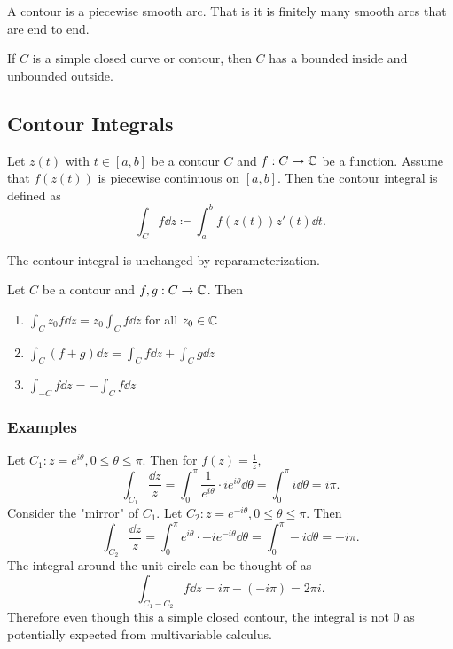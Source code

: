 \documentclass[../notes.tex]{subfiles}
\begin{document}
\begin{definition}[Contour]
    A contour is a piecewise smooth arc. That is it is finitely many smooth arcs that are end to end.
\end{definition}

\begin{theorem}
    If $C$ is a simple closed curve or contour, then $C$ has a bounded inside and unbounded outside.
\end{theorem}

\subsection{Contour Integrals}

\begin{definition}
    Let $z(t)$ with $t \in [a,b]$ be a contour $C$ and $f: C \to \mathbb{C}$ be a function. Assume that $f(z(t))$ is piecewise continuous on $[a,b]$. Then the contour integral is defined as
    \[
        \int_C f\dd z \coloneq \int_a^b f(z(t)) z'(t) \dd t
    .\]

    \begin{remark}
        The contour integral is unchanged by reparameterization.
    \end{remark}
\end{definition}

\begin{theorem}
    \label{thm:propsofcontoursint}
    Let $C$ be a contour and $f,g : C \to \mathbb{C}$. Then
    \begin{enumerate}
        \item $\displaystyle \int_C z_0 f \dd z = z_0 \int_C f \dd z$ for all $z_0 \in \mathbb{C}$
        \item $\displaystyle \int_C (f+g) \dd z = \int_C f \dd z + \int_C g \dd z$
        \item $\displaystyle \int_{-C} f \dd z = - \int_C f \dd z$
    \end{enumerate}
\end{theorem}

\subsubsection{Examples}

\begin{example}
    Let $C_1 : z = e^{i \theta}, 0 \leq \theta \leq \pi$. Then for $f(z) = \frac{1}{z}$,
    \[
        \int_{C_1} \frac{\dd z}{z} = \int_0^\pi \frac{1}{e^{i \theta}} \cdot i e^{i \theta} \dd \theta = \int_0^\pi i \dd \theta = i \pi
    .\]
    Consider the "mirror" of $C_1$. Let $C_2 : z = e^{-i \theta}, 0 \leq \theta \leq \pi$. Then
    \[
        \int_{C_2} \frac{\dd z}{z} = \int_0^\pi e^{i \theta} \cdot -i e^{-i \theta} \dd \theta = \int_0^\pi -i \dd \theta = -i \pi
    .\]
    The integral around the unit circle can be thought of as \[
        \int_{C_1 - C_2} f \dd z = i \pi - (- i \pi) = 2 \pi i
    .\]
    Therefore even though this a simple closed contour, the integral is not $0$ as potentially expected from multivariable calculus.
\end{example}
\end{document}
